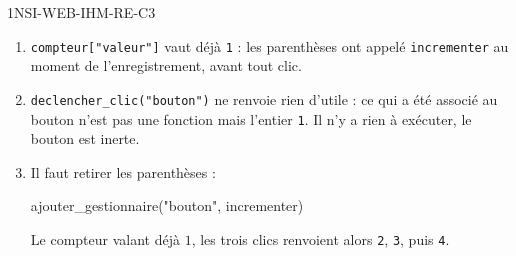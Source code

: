 \begin{corrige}{1NSI-WEB-IHM-RE-C3}
\begin{enumerate}
  \item \lstinline{compteur["valeur"]} vaut déjà \lstinline{1} : les parenthèses ont appelé
        \lstinline{incrementer} au moment de l'enregistrement, avant tout clic.
  \item \lstinline{declencher_clic("bouton")} ne renvoie rien d'utile : ce qui a été associé au
        bouton n'est pas une fonction mais l'entier \lstinline{1}. Il n'y a rien à exécuter,
        le bouton est inerte.
  \item Il faut retirer les parenthèses :
        \begin{python}
ajouter_gestionnaire("bouton", incrementer)
        \end{python}
        Le compteur valant déjà $1$, les trois clics renvoient alors
        \lstinline{2}, \lstinline{3}, puis \lstinline{4}.
\end{enumerate}
\end{corrige}
